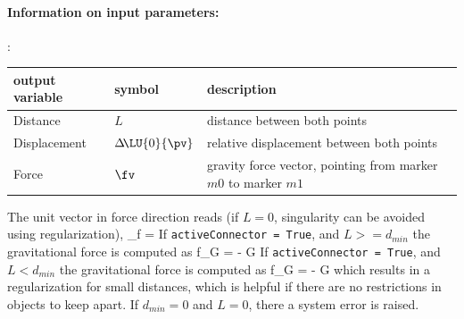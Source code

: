 \paragraph{Information on input parameters:} 
\finishTable

:
\begin{center}
\footnotesize
\begin{longtable}{| p{5cm} | p{5cm} | p{6cm} |} 
\hline
\bf output variable & \bf symbol & \bf description \\ \hline
Distance & $L$ & distance between both points\\ \hline
Displacement & $\Delta\! \LU{0}{\pv}$ & relative displacement between both points\\ \hline
Force & $\fv$ & gravity force vector, pointing from marker $m0$ to marker $m1$\\ \hline
\end{longtable}
\end{center}
 \noindent
    \finishTable
    \finishTable
    The unit vector in force direction reads (if $L=0$, singularity can be avoided using regularization),
    \be
      \vv_{f} =  \Delta\! 
    \ee
    If \texttt{activeConnector = True}, and $L>=d_{min}$ the gravitational force is computed as
    \be
      f_G = - G 
    \ee
    If \texttt{activeConnector = True}, and $L<d_{min}$ the gravitational force is computed as
    \be
      f_G = - G 
    \ee
    which results in a regularization for small distances, which is helpful if there are no restrictions in objects to keep apart.
    If $d_{min}=0$ and $L=0$, there a system error is raised.
    
